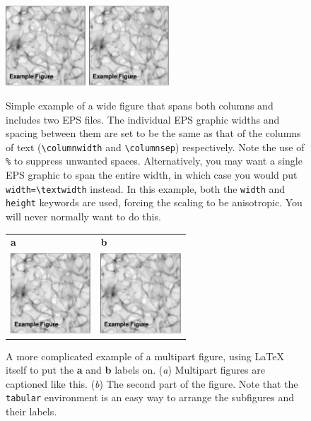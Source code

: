 \documentclass[debug]{rmxaa}
\newcommand{\CS}[1]{\texttt{\textbackslash #1}}
\begin{document}
\begin{figure}[!t]
  \includegraphics[width=0.45\linewidth,height=3cm]{example-fig}%
  \hfill
  \includegraphics[width=0.45\linewidth,height=3cm]{example-fig}
  \caption{Simple example of a wide figure that spans both
    columns and includes two EPS files. The individual EPS graphic
    widths and spacing between them are set to be the same as that of
    the columns of text (\CS{columnwidth} and \CS{columnsep})
    respectively. Note the use of \texttt{\%} to suppress unwanted
    spaces. Alternatively, you may want a single EPS graphic to span
    the entire width, in which case you would put
    \texttt{width=\CS{textwidth}} instead. In this example, both the
    \texttt{width} and \texttt{height} keywords are used, forcing the
    scaling to be anisotropic. You will never normally want to do
    this.}
  \label{fig:widefig1}
\end{figure}

\begin{figure}[!t]
  \newlength\thisfigwidth
  \setlength{}
  \addtolength\thisfigwidth{-0.5cm}
  \begin{tabular}{ll}
    \textbf{a} & \textbf{b} \\
    \includegraphics[width=\thisfigwidth,height=3cm]{example-fig}
    & \includegraphics[width=\thisfigwidth,height=3cm]{example-fig}
  \end{tabular}
  \caption{A more complicated example of a multipart figure, using
    \LaTeX{} itself to put the \textbf{a} and \textbf{b} labels
    on. (\textit{a}) Multipart figures are captioned like this.
    (\textit{b}) The second part of the figure.  Note that the
    \texttt{tabular} environment is an easy way to arrange the
    subfigures and their labels.  }
  \label{fig:widefig2}
\end{figure}
\end{document}
